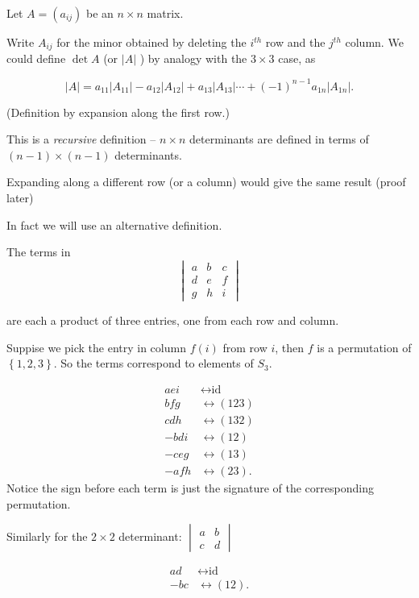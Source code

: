 \documentclass{article}
\theoremstyle{definition} \newtheorem*{definition}{Definition}
\begin{document}
Let $A=(a_{ij})$  be an $n \times n$ matrix.

Write $A_{ij}$ for the minor obtained by deleting the $i^{th}$ row and the
$j^{th}$ column. We could define $\det A$ (or $|A|$ ) by analogy with the $3
\times 3$ case, as

\[ |A| = a_{11}|A_{11}| - a_{12}|A_{12}| + a_{13}|A_{13}| \cdots +
(-1)^{n-1}a_{1n}|A_{1n}|.  \]

(Definition by expansion along the first row.)

This is a \emph{recursive} definition -- $n \times n$ determinants are defined
in terms of $(n-1) \times (n-1)$ determinants.

Expanding along a different row (or a column) would give the same result (proof
later)


In fact we will use an alternative definition.

The terms in \[ \begin{vmatrix} a & b & c \\ d & e & f \\ g & h & i
\end{vmatrix} \]

are each a product of three entries, one from each row and column.

Suppise we pick the entry in column $f(i)$ from row $i$, then $f$ is a
permutation of $\left\{ 1,2,3 \right\}$. So the terms correspond to elements of
$S_3$.

\begin{align*} aei &\leftrightarrow \text{id} \\ bfg &\leftrightarrow (123) \\
  cdh &\leftrightarrow (132) \\ -bdi &\leftrightarrow (12) \\ -ceg
  &\leftrightarrow (13) \\ -afh &\leftrightarrow (23).  \end{align*} Notice the
sign before each term is just the signature of the corresponding permutation.

Similarly for the $2 \times 2$ determinant: $\begin{vmatrix}a & b \\ c &
  d\end{vmatrix}$

\begin{align*} ad &\leftrightarrow \text{id} \\ -bc &\leftrightarrow (12).
\end{align*}
\end{document}
